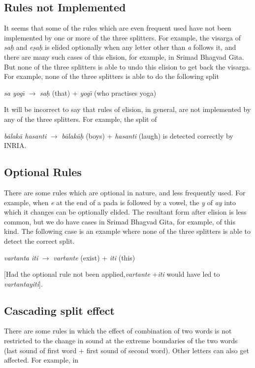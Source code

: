 \documentclass[11pt]{article}
\begin{document}
\subsection{Rules not Implemented}
      It seems that some of the rules which are even frequent used have not been implemented by one or more of the three splitters. For example, the visarga of \textit{sa\d{h}} and \textit{e\d{s}a\d{h}} is elided optionally when any letter other than \textit{a} follows it, and there are many such cases of this elision, for example, in Srimad Bhagvad Gita. But none of the three splitters is able to undo this elision to get back the visarga. For example, none of the three splitters is able to do the following split
      
                        \textit{sa yog\={\i}} $\rightarrow$ \textit{sa\d{h}} (that) + \textit{yog\={\i}} (who practises yoga)
                        
It will be incorrect to say that rules of elision, in general, are not implemented by any of the three splitters. For example, the split of
 
            \textit{b\={a}lak\={a} hasanti} $\rightarrow$ \textit{b\={a}lak\={a}\d{h}} (boys) + \textit{hasanti} (laugh) is detected correctly by INRIA.                      

    
\subsection{Optional Rules}    
There are some rules which are optional in nature, and less frequently used. For example, when \textit{e} at the end of a pada is followed by a vowel, the \textit{y} of \textit{ay} into which it changes can be optionally elided. The resultant form after elision is less common, but we do have cases in Srimad Bhagvad Gita, for example, of this kind. The following case is an example where none of the three splitters is able to detect the correct split.
    
   \textit{ vartanta iti} $\rightarrow$ \textit{vartante} (exist) + \textit{iti} (this)
   
[Had the optional rule not been applied,\textit{vartante} +\textit{iti} would have led to \textit{vartantayiti}]. 

\subsection{Cascading split effect}
There are some rules in which the effect of combination of two words is not restricted to the change in sound at the extreme boundaries of the two words (last sound of first word + first sound of second word). Other letters can also get affected. For example, in 
\end{document}
